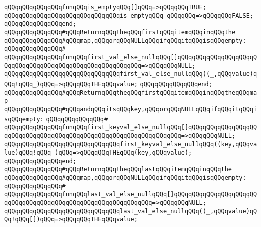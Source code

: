 \verb|qQQqqQQqqQQqqQQqfunqQQqis_emptyqQQq[]qQQq=>qQQqqQQqTRUE;|\newline
\verb|qQQqqQQqqQQqqQQqqQQqqQQqqQQqqQQqis_emptyqQQq_qQQqqQQq=>qQQqqQQqFALSE;|\newline
\verb|qQQqqQQqqQQqqQQqend;|\newline
\newline
\newline
\verb|qQQqqQQqqQQqqQQq#qQQqReturnqQQqtheqQQqfirstqQQqitemqQQqinqQQqthe|\newline
\verb|qQQqqQQqqQQqqQQq#qQQqmap,qQQqorqQQqNULLqQQqifqQQqitqQQqisqQQqempty:|\newline
\verb|qQQqqQQqqQQqqQQq#|\newline
\verb|qQQqqQQqqQQqqQQqfunqQQqfirst_val_else_nullqQQq[]qQQqqQQqqQQqqQQqqQQqqQQqqQQqqQQqqQQqqQQqqQQqqQQqqQQqqQQqqQQq=>qQQqqQQqNULL;|\newline
\verb|qQQqqQQqqQQqqQQqqQQqqQQqqQQqqQQqfirst_val_else_nullqQQq((_,qQQqvalue)qQQq!qQQq_)qQQq=>qQQqqQQqTHEqQQqvalue;|\newline
\verb|qQQqqQQqqQQqqQQqend;|\newline
\newline
\verb|qQQqqQQqqQQqqQQq#qQQqReturnqQQqtheqQQqfirstqQQqitemqQQqinqQQqtheqQQqmap|\newline
\verb|qQQqqQQqqQQqqQQq#qQQqandqQQqitsqQQqkey,qQQqorqQQqNULLqQQqifqQQqitqQQqisqQQqempty:|\newline
\verb|qQQqqQQqqQQqqQQq#|\newline
\verb|qQQqqQQqqQQqqQQqfunqQQqfirst_keyval_else_nullqQQq[]qQQqqQQqqQQqqQQqqQQqqQQqqQQqqQQqqQQqqQQqqQQqqQQqqQQqqQQqqQQqqQQqqQQq=>qQQqqQQqNULL;|\newline
\verb|qQQqqQQqqQQqqQQqqQQqqQQqqQQqqQQqfirst_keyval_else_nullqQQq((key,qQQqvalue)qQQq!qQQq_)qQQq=>qQQqqQQqTHEqQQq(key,qQQqvalue);|\newline
\verb|qQQqqQQqqQQqqQQqend;|\newline
\newline
\newline
\verb|qQQqqQQqqQQqqQQq#qQQqReturnqQQqtheqQQqlastqQQqitemqQQqinqQQqthe|\newline
\verb|qQQqqQQqqQQqqQQq#qQQqmap,qQQqorqQQqNULLqQQqifqQQqitqQQqisqQQqempty:|\newline
\verb|qQQqqQQqqQQqqQQq#|\newline
\verb|qQQqqQQqqQQqqQQqfunqQQqlast_val_else_nullqQQq[]qQQqqQQqqQQqqQQqqQQqqQQqqQQqqQQqqQQqqQQqqQQqqQQqqQQqqQQqqQQqqQQq=>qQQqqQQqNULL;|\newline
\verb|qQQqqQQqqQQqqQQqqQQqqQQqqQQqqQQqlast_val_else_nullqQQq((_,qQQqvalue)qQQq!qQQq[])qQQq=>qQQqqQQqTHEqQQqvalue;|\newline
